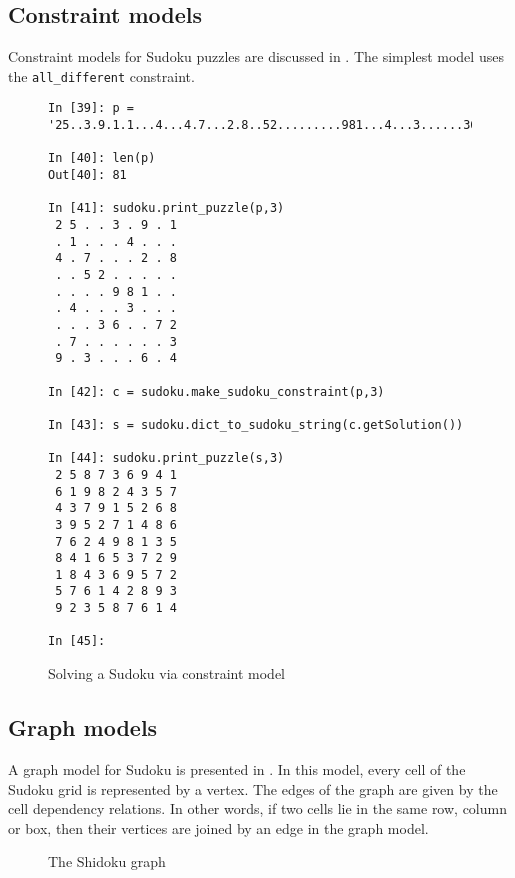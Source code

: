 \subsection{Constraint models}
\label{sec:models:constraints}

Constraint models for Sudoku puzzles are discussed in \cite{simonissudoku}. The simplest model uses the \verb!all_different! constraint.

\begin{figure}[h]
\begin{lstlisting}[frame=tb]
In [39]: p = '25..3.9.1.1...4...4.7...2.8..52.........981...4...3......36..72.7......39.3...6.4'

In [40]: len(p)
Out[40]: 81

In [41]: sudoku.print_puzzle(p,3)
 2 5 . . 3 . 9 . 1 
 . 1 . . . 4 . . . 
 4 . 7 . . . 2 . 8 
 . . 5 2 . . . . . 
 . . . . 9 8 1 . . 
 . 4 . . . 3 . . . 
 . . . 3 6 . . 7 2 
 . 7 . . . . . . 3 
 9 . 3 . . . 6 . 4 

In [42]: c = sudoku.make_sudoku_constraint(p,3)

In [43]: s = sudoku.dict_to_sudoku_string(c.getSolution())

In [44]: sudoku.print_puzzle(s,3)
 2 5 8 7 3 6 9 4 1 
 6 1 9 8 2 4 3 5 7 
 4 3 7 9 1 5 2 6 8 
 3 9 5 2 7 1 4 8 6 
 7 6 2 4 9 8 1 3 5 
 8 4 1 6 5 3 7 2 9 
 1 8 4 3 6 9 5 7 2 
 5 7 6 1 4 2 8 9 3 
 9 2 3 5 8 7 6 1 4 

In [45]: 
\end{lstlisting}
\caption{Solving a Sudoku via constraint model}
\end{figure}

\subsection{Graph models}
\label{sec:models:graph}

A graph model for Sudoku is presented in \cite{gagovargaset}. In this model, every cell of the Sudoku grid is represented by a vertex. The edges of the graph are given by the cell dependency relations. In other words, if two cells lie in the same row, column or box, then their vertices are joined by an edge in the graph model.

\begin{figure}[h]
\centering
\begin{dot2tex}[circo,mathmode,options={--graphstyle "scale=0.40"}]
  
\end{dot2tex}
\caption{The Shidoku graph}
\end{figure}

